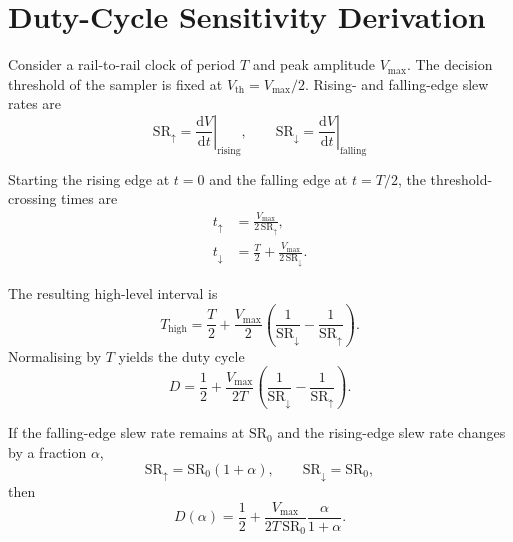 \section{Duty-Cycle Sensitivity Derivation}
\label{app:duty_cycle_derivation}

Consider a rail-to-rail clock of period $T$ and peak amplitude $V_{\max}$. The decision threshold of the sampler is fixed at $V_{\text{th}} = V_{\max}/2$. Rising- and falling-edge slew rates are
\begin{equation}
\text{SR}_{\uparrow} = \left.\frac{\mathrm{d}V}{\mathrm{d}t}\right|_{\text{rising}},\qquad
\text{SR}_{\downarrow} = \left.\frac{\mathrm{d}V}{\mathrm{d}t}\right|_{\text{falling}}
\label{eq:slew_def}
\end{equation}

Starting the rising edge at $t=0$ and the falling edge at $t=T/2$, the threshold-crossing times are
\begin{subequations}\label{eq:t_cross}
\begin{align}
 t_{\uparrow} &= \frac{V_{\max}}{2\,\text{SR}_{\uparrow}},\\
 t_{\downarrow} &= \frac{T}{2} + \frac{V_{\max}}{2\,\text{SR}_{\downarrow}}.
\end{align}
\end{subequations}

The resulting high-level interval is
\[
T_{\text{high}} = \frac{T}{2} + \frac{V_{\max}}{2}\left(\frac{1}{\text{SR}_{\downarrow}}-\frac{1}{\text{SR}_{\uparrow}}\right).
\]
Normalising by $T$ yields the duty cycle
\begin{equation}
D = \frac{1}{2} + \frac{V_{\max}}{2T}\left(\frac{1}{\text{SR}_{\downarrow}}-\frac{1}{\text{SR}_{\uparrow}}\right).
\label{eq:D_general}
\end{equation}

If the falling-edge slew rate remains at $\text{SR}_0$ and the rising-edge slew rate changes by a fraction $\alpha$,
\[
\text{SR}_{\uparrow} = \text{SR}_0(1+\alpha),\qquad \text{SR}_{\downarrow} = \text{SR}_0,
\]
then
\begin{equation}
D(\alpha) = \frac{1}{2} + \frac{V_{\max}}{2T\,\text{SR}_0}\frac{\alpha}{1+\alpha}.
\label{eq:D_rising_knob}
\end{equation}
